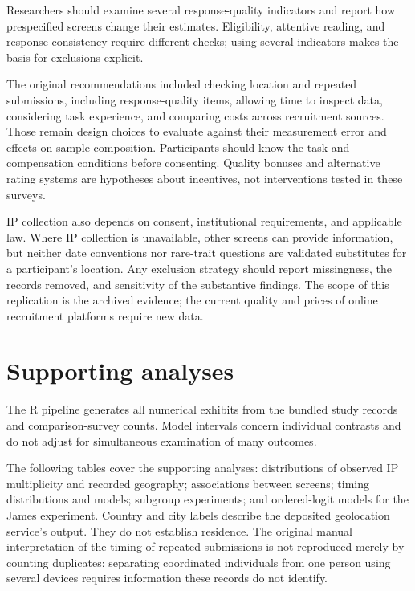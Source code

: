 \documentclass[11pt]{article}
\begin{document}
Researchers should examine several response-quality indicators and report how prespecified screens change their estimates. Eligibility, attentive reading, and response consistency require different checks; using several indicators makes the basis for exclusions explicit.

The original recommendations included checking location and repeated submissions, including response-quality items, allowing time to inspect data, considering task experience, and comparing costs across recruitment sources. Those remain design choices to evaluate against their measurement error and effects on sample composition. Participants should know the task and compensation conditions before consenting. Quality bonuses and alternative rating systems are hypotheses about incentives, not interventions tested in these surveys.

IP collection also depends on consent, institutional requirements, and applicable law. Where IP collection is unavailable, other screens can provide information, but neither date conventions nor rare-trait questions are validated substitutes for a participant's location. Any exclusion strategy should report missingness, the records removed, and sensitivity of the substantive findings. The scope of this replication is the archived evidence; the current quality and prices of online recruitment platforms require new data.

\clearpage


\clearpage
\appendix
\section{Supporting analyses}

The R pipeline generates all numerical exhibits from the bundled study records and comparison-survey counts. Model intervals concern individual contrasts and do not adjust for simultaneous examination of many outcomes.

The following tables cover the supporting analyses: distributions of observed IP multiplicity and recorded geography; associations between screens; timing distributions and models; subgroup experiments; and ordered-logit models for the James experiment. Country and city labels describe the deposited geolocation service's output. They do not establish residence. The original manual interpretation of the timing of repeated submissions is not reproduced merely by counting duplicates: separating coordinated individuals from one person using several devices requires information these records do not identify.
\end{document}
